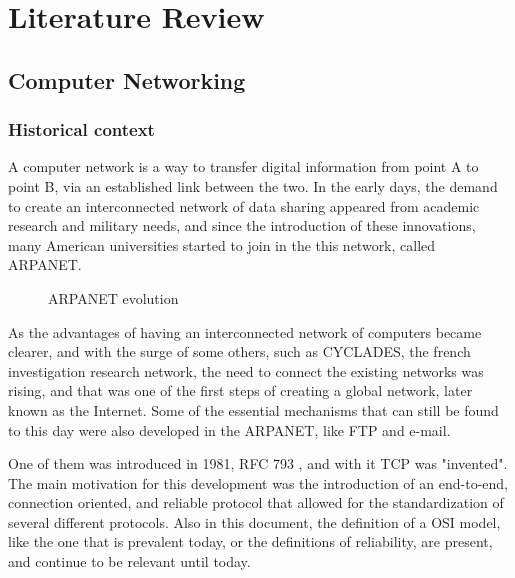 \chapter{Literature Review} \label{chap:bib} %

\section {Computer Networking}

\subsection {Historical context}
\hspace {5mm} 

A computer network is a way to transfer digital information from point A to point B, via an established link
between the two. In the early days, the demand to create an interconnected network of data sharing 
appeared from academic research and military needs, and since the introduction of these innovations, many 
American universities started to join in the this network, called ARPANET.

\begin{figure}[!tbph]
  \centering
  \hfill
  \caption {ARPANET evolution}
  \label{fig:arpa}
\end{figure}

\p As the advantages of having an interconnected network of computers became clearer, and with the surge of some others, 
such as CYCLADES, the french investigation research network, the need to connect the existing networks was rising, 
and that was one of the first steps of creating a global network, later known as the Internet. Some of the essential mechanisms that can still be found to this day were also developed in the ARPANET, like FTP and e-mail.

\p One of them was introduced in 1981, RFC 793 \cite{postel_transmission_1981}, and with it TCP was "invented".
The main motivation for this development was the introduction of an end-to-end, connection oriented, and reliable protocol that allowed for the standardization of 
several different protocols. Also in this document, the definition of a OSI model, like the one that is prevalent today, or the definitions of reliability, are present, and continue
to be relevant until today.

